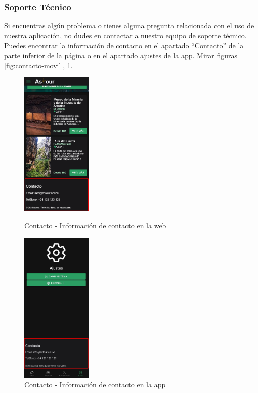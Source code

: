 \subsubsection{Soporte Técnico}
Si encuentras algún problema o tienes alguna pregunta relacionada con el uso de nuestra aplicación, no dudes en contactar a nuestro equipo de soporte técnico.
Puedes encontrar la información de contacto en el apartado “Contacto” de la parte inferior de la página o en el apartado ajustes de la app. Mirar figuras \ref{fig:contacto-movil}, \ref{fig:contacto-app}.
\begin{figure}[H]
	\centering
	\begin{minipage}{0.45\textwidth}
		\centering
		\includegraphics[width=0.3\textwidth]{7-Construccion/Manuales/mobile/contacto.png}
		\caption{Contacto - Información de contacto en la web}
		\label{fig:contacto-movil}
	\end{minipage}
	\hfill
	\begin{minipage}{0.45\textwidth}
		\centering
		\includegraphics[width=0.3\textwidth]{7-Construccion/Manuales/app/soporte.png}
		\caption{Contacto - Información de contacto en la app}
		\label{fig:contacto-app}
	\end{minipage}
\end{figure}

